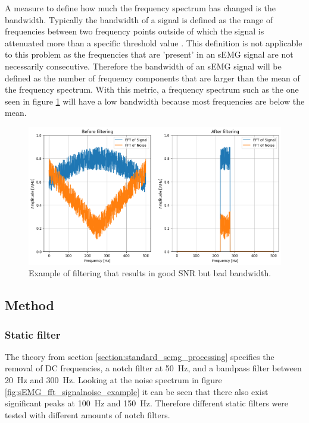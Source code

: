 A measure to define how much the frequency spectrum has changed is the bandwidth. Typically the bandwidth of a signal is defined as the range of frequencies between two frequency points outside of which the signal is attenuated more than a specific threshold value \cite{bandwidth_definition}. This definition is not applicable to this problem as the frequencies that are 'present' in an sEMG signal are not necessarily consecutive. Therefore the bandwidth of an sEMG signal will be defined as the number of frequency components that are larger than the mean of the frequency spectrum. With this metric, a frequency spectrum such as the one seen in figure \ref{fig:good_snr_bad_integrity} will have a low bandwidth because most frequencies are below the mean.

\begin{figure}[h!t]
	\begin{center}
		\includegraphics[width=1.0\columnwidth]{images/good_snr_bad_integrity.png}
	\end{center}
	\caption{Example of filtering that results in good SNR but bad bandwidth.}
	\label{fig:good_snr_bad_integrity}
\end{figure}


\subsection{Method}
\subsubsection{Static filter}
The theory from section \ref{section:standard_semg_processing} specifies the removal of DC frequencies, a notch filter at \SI{50}{Hz}, and a bandpass filter between \SI{20}{Hz} and \SI{300}{Hz}. Looking at the noise spectrum in figure \ref{fig:sEMG_fft_signalnoise_example} it can be seen that there also exist significant peaks at \SI{100}{Hz} and \SI{150}{Hz}. Therefore different static filters were tested with different amounts of notch filters. 

